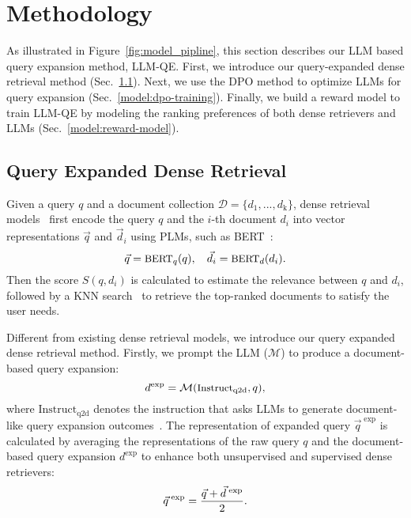 
\section{Methodology}
As illustrated in Figure~\ref{fig:model_pipline}, this section describes our LLM based query expansion method, LLM-QE. First, we introduce our query-expanded dense retrieval method (Sec.~\ref{model:preliminary}). Next, we use the DPO method to optimize LLMs for query expansion (Sec.~\ref{model:dpo-training}). Finally, we build a reward model to train LLM-QE by modeling the ranking preferences of both dense retrievers and LLMs (Sec.~\ref{model:reward-model}).



\subsection{Query Expanded Dense Retrieval}\label{model:preliminary}

Given a query $q$ and a document collection $\mathcal{D} = \{d_\text{1}, ..., d_\text{k}\}$, dense retrieval models~\cite{karpukhin2020dense,xiong2021approximate,cocondenser} first encode the query $q$ and the $i$-th document $d_i$ into vector representations $\vec{q}$ and $\vec{d}_i$ using PLMs, such as BERT~\cite{devlin2019bert}:
\begin{equation}\label{eq:encode}
\small
    \vec{q} = \text{BERT}_q (q),  \quad  \vec{d}_i = \text{BERT}_d (d_i).
\end{equation}
Then the score $S(q, d_i)$ is calculated to estimate the relevance between $q$ and $d_i$, followed by a KNN search~\cite{douze2024faiss} to retrieve the top-ranked documents to satisfy the user needs. 

Different from existing dense retrieval models, we introduce our query expanded dense retrieval method. Firstly, we prompt the LLM ($\mathcal{M}$) to produce a document-based query expansion:
\begin{equation}
\small
d^{\text{exp}} = \mathcal{M}(\text{Instruct}_\text{q2d}, q),
\end{equation}
where $\text{Instruct}_\text{q2d}$ denotes the instruction that asks LLMs to generate document-like query expansion outcomes~\cite{jagerman2023query}.
The representation of expanded query $\vec{q}^{\; \text{exp}}$ is calculated by averaging the representations of the raw query $q$ and the document-based query expansion $d^{\text{exp}}$ to enhance both unsupervised and supervised dense retrievers:
\begin{equation}\label{eq:qexp}
\small
    \vec{q}^{\; \text{exp}} = \frac{\vec{q} + \vec{d}^{\; \text{exp}}}{2}.
\end{equation}


